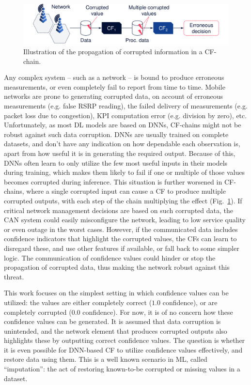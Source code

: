 				\begin{figure}[ht]
					\centering
					\includegraphics[width=\linewidth]{figures/12_imputation/cf_chain/cf_chain.pdf}
					\caption[Illustration of the propagation of corrupted information in a CF-chain]{Illustration of the propagation of corrupted information in a CF-chain.}
					\label{fig:cf_chain}
				\end{figure}
		
				Any complex system -- such as a network -- is bound to produce erroneous measurements, or even completely fail to report from time to time.
				Mobile networks are prone to generating corrupted data, on account of erroneous measurements (e.g. false \ac{RSRP} reading), the failed delivery of measurements (e.g. packet loss due to congestion), \ac{KPI} computation error (e.g. division by zero), etc.
				Unfortunately, as most \ac{DL} models are based on \acp{DNN}, \ac{CF}-chains might not be robust against such data corruption.
				\acp{DNN} are usually trained on complete datasets, and don't have any indication on how dependable each observation is, apart from how useful it is in generating the required output.
				Because of this, \acp{DNN} often learn to only utilize the few most useful inputs in their models during training, which makes them likely to fail if one or multiple of those values becomes corrupted during inference.
				This situation is further worsened in \ac{CF}-chains, where a single corrupted input can cause a \ac{CF} to produce multiple corrupted outputs, with each step of the chain multiplying the effect (Fig.~\ref{fig:cf_chain}).		
				If critical network management decisions are based on such corrupted data, the \ac{CAN} system could easily misconfigure the network, leading to low service quality or even outage in the worst cases.
				However, if the communicated data includes confidence indicators that highlight the corrupted values, the \acp{CF} can learn to disregard these, and use other features if available, or fall back to some simpler logic.
				The communication of confidence values could hinder or stop the propagation of corrupted data, thus making the network robust against this threat.
		
				This work focuses on the simplest setting in which confidence values can be utilized: the values are either completely correct ($1.0$ confidence), or are completely corrupted ($0.0$ confidence).
				For now, it is of no concern how these confidence values can be generated.
				It is assumed that data corruption is unintended, and the network element that produces corrupted outputs also highlights these by outputting correct confidence values.
				The question is whether it is even possible for \ac{DNN}-based \ac{CF} to utilize confidence values effectively, and restore data using them.
				This is a well known scenario in \ac{ML}, called ``imputation'': the act of restoring known-to-be corrupted or missing values in a dataset.

